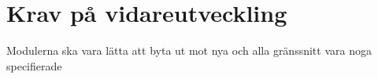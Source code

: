 \section{Krav på vidareutveckling}
Modulerna ska vara lätta att byta ut mot nya och alla gränssnitt vara noga specifierade